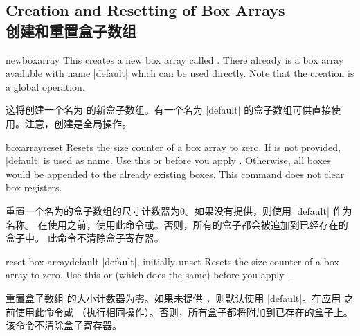 \subsection{Creation and Resetting of Box Arrays\\创建和重置盒子数组}\label{subsec:magazine_creation}

\begin{docCommand}[doc new=2015-07-13]{newboxarray}{}
This creates a new box array called . There already is a
box array available with name |default| which can be used directly.
Note that the creation is a global operation.

这将创建一个名为  的新盒子数组。有一个名为 |default| 的盒子数组可供直接使用。注意，创建是全局操作。
\begin{dispListing}
\end{dispListing}
\end{docCommand}


\begin{docCommand}[doc new=2015-07-13]{boxarrayreset}{}
Resets the size counter of a box array  to zero.
If  is not provided, |default| is used as name.
Use this or  before
you apply . Otherwise, all boxes would
be appended to the already existing boxes.
This command does not clear box registers.

重置一个名为的盒子数组的尺寸计数器为0。如果没有提供，则使用 |default| 作为名称。
在使用之前，使用此命令或。否则，所有的盒子都会被追加到已经存在的盒子中。
此命令不清除盒子寄存器。
\begin{dispListing}
\boxarrayreset            %
\end{dispListing}
\end{docCommand}


\begin{docTcbKey}[][doc new=2015-07-13]{reset box array}{}{default |default|, initially unset}
Resets the size counter of a box array  to zero.
Use this or  (which does the same) before
you apply .

重置盒子数组  的大小计数器为零。如果未提供 ，则默认使用 |default|。在应用  之前使用此命令或 （执行相同操作）。否则，所有盒子都将附加到已存在的盒子上。该命令不清除盒子寄存器。
\begin{dispListing}
\end{dispListing}
\end{docTcbKey}

